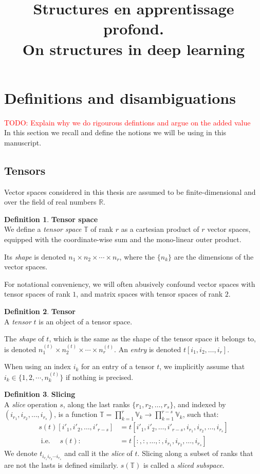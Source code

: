 \documentclass{article}
\title{Structures en apprentissage profond.\\ On structures in deep learning}
\theoremstyle{definition}
\newtheorem{definition}{Definition}[section]
\newcommand{\real}{\mathbb{R}}
\newcommand{\tspace}{\mathbb{T}}
\newcommand{\vecspace}{\mathbb{V}}
\newcommand{\todo}[1]{\textcolor{red}{TODO: #1\\}}
\begin{document}
\section{Definitions and disambiguations}

\todo{Explain why we do rigourous defintions and argue on the added value}
In this section we recall and define the notions we will be using in this manuscript.

\subsection{Tensors}

Vector spaces considered in this thesis are assumed to be finite-dimensional and over the field of real numbers $\real$.

\begin{definition}\textbf{Tensor space}\\
We define a \emph{tensor space} $\tspace$ of rank $r$ as a cartesian product of $r$ vector spaces, equipped with the coordinate-wise sum and the mono-linear outer product.

Its \emph{shape} is denoted $n_1 \times n_2 \times \cdots \times n_r$, where the $\{n_k\}$ are the dimensions of the vector spaces.
\end{definition}

For notational conveniency, we will often abusively confound vector spaces with tensor spaces of rank $1$, and matrix spaces with tensor spaces of rank $2$.

\begin{definition}\textbf{Tensor}\\
A \emph{tensor} $t$ is an object of a tensor space.

The \emph{shape} of $t$, which is the same as the shape of the tensor space it belongs to, is denoted $n_1^{(t)} \times n_2^{(t)} \times \cdots \times n_r^{(t)}$.
An \emph{entry} is denoted $t[i_1, i_2, \ldots, i_r]$.
\end{definition}

When using an index $i_k$ for an entry of a tensor $t$, we implicitly assume that $i_k \in \{1, 2, \cdots, n_k^{(t)}\}$ if nothing is precised.

\begin{definition}\textbf{Slicing}\\
A \emph{slice} operation $s$, along the last ranks $\{r_1, r_2, \ldots, r_s\}$, and indexed by $(i_{r_1}, i_{r_2}, \ldots, i_{r_s})$, is a function $\tspace = \displaystyle \prod_{k=1}^r \vecspace_k \rightarrow \prod_{k=1}^{r-s} \vecspace_k$, such that:
\begin{align*}
s(t)[i'_1, i'_2, \ldots, i'_{r-s}] &= t[i'_1, i'_2, \ldots, i'_{r-s}, i_{r_1}, i_{r_2}, \ldots, i_{r_s}] \\
\text{ i.e. } \quad s(t) :&= t[:,:, \ldots, :, i_{r_1}, i_{r_2}, \ldots, i_{r_s}]
\end{align*}
We denote $t_{i_{r_1} i_{r_2} \cdots i_{r_s}}$ and call it the \emph{slice} of $t$. 
Slicing along a subset of ranks that are not the lasts is defined similarly.
$s(\tspace)$ is called a \emph{sliced subspace}.
\end{definition}
\end{document}
